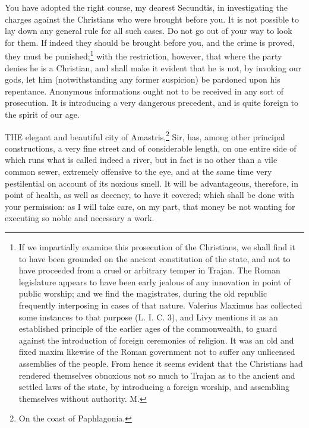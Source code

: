 
You have adopted the right course, my dearest Secundtis, in investigating
the charges against the Christians who were brought before you. It is not
possible to lay down any general rule for all such cases. Do not go out of
your way to look for them. If indeed they should be brought before you,
and the crime is proved, they must be punished;\footnote{If we impartially
examine this prosecution of the Christians, we shall find it to have been
grounded on the ancient constitution of the state, and not to have
proceeded from a cruel or arbitrary temper in Trajan. The Roman
legislature appears to have been early jealous of any innovation in point
of public worship; and we find the magistrates, during the old republic
frequently interposing in cases of that nature. Valerius Maximus has
collected some instances to that purpose (L. I. C. 3), and Livy mentions
it as an established principle of the earlier ages of the commonwealth, to
guard against the introduction of foreign ceremonies of religion. It was
an old and fixed maxim likewise of the Roman government not to suffer any
unlicensed assemblies of the people. From hence it seems evident that the
Christians had rendered themselves obnoxious not so much to Trajan as to
the ancient and settled laws of the state, by introducing a foreign
worship, and assembling themselves without authority. M.} with the
restriction, however, that where the party denies he is a Christian, and
shall make it evident that he is not, by invoking our gods, let him
(notwithstanding any former suspicion) be pardoned upon his repentance.
Anonymous informations ought not to be received in any sort of
prosecution. It is introducing a very dangerous precedent, and is quite
foreign to the spirit of our age.


THE elegant and beautiful city of Amastris,\footnote{On the coast of
Paphlagonia.} Sir, has, among
other principal constructions, a very fine street and of considerable
length, on one entire side of which runs what is called indeed a river,
but in fact is no other than a vile common sewer, extremely offensive to
the eye, and at the same time very pestilential on account of its noxious
smell. It will be advantageous, therefore, in point of health, as well as
decency, to have it covered; which shall be done with your permission: as
I will take care, on my part, that money be not wanting for executing so
noble and necessary a work.

